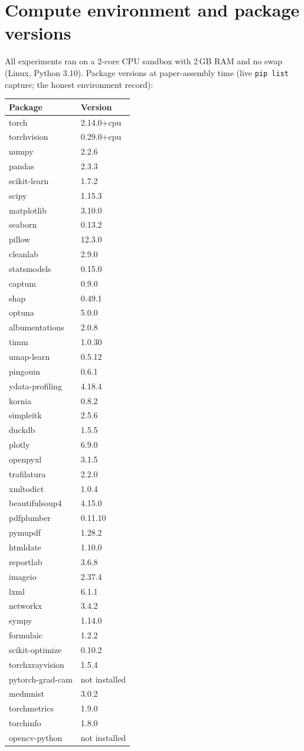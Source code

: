 
\section{Compute environment and package versions}
All experiments ran on a 2-core CPU sandbox with 2\,GB RAM and no swap
(Linux, Python 3.10). Package versions at paper-assembly time (live
\texttt{pip list} capture; the honest environment record):
\begin{longtable}{l l}
\hline Package & Version \\ \hline \endhead
torch & 2.14.0+cpu \\
torchvision & 0.29.0+cpu \\
numpy & 2.2.6 \\
pandas & 2.3.3 \\
scikit-learn & 1.7.2 \\
scipy & 1.15.3 \\
matplotlib & 3.10.0 \\
seaborn & 0.13.2 \\
pillow & 12.3.0 \\
cleanlab & 2.9.0 \\
statsmodels & 0.15.0 \\
captum & 0.9.0 \\
shap & 0.49.1 \\
optuna & 5.0.0 \\
albumentations & 2.0.8 \\
timm & 1.0.30 \\
umap-learn & 0.5.12 \\
pingouin & 0.6.1 \\
ydata-profiling & 4.18.4 \\
kornia & 0.8.2 \\
simpleitk & 2.5.6 \\
duckdb & 1.5.5 \\
plotly & 6.9.0 \\
openpyxl & 3.1.5 \\
trafilatura & 2.2.0 \\
xmltodict & 1.0.4 \\
beautifulsoup4 & 4.15.0 \\
pdfplumber & 0.11.10 \\
pymupdf & 1.28.2 \\
htmldate & 1.10.0 \\
reportlab & 3.6.8 \\
imageio & 2.37.4 \\
lxml & 6.1.1 \\
networkx & 3.4.2 \\
sympy & 1.14.0 \\
formulaic & 1.2.2 \\
scikit-optimize & 0.10.2 \\
torchxrayvision & 1.5.4 \\
pytorch-grad-cam & not installed \\
medmnist & 3.0.2 \\
torchmetrics & 1.9.0 \\
torchinfo & 1.8.0 \\
opencv-python & not installed \\
\hline
\end{longtable}
